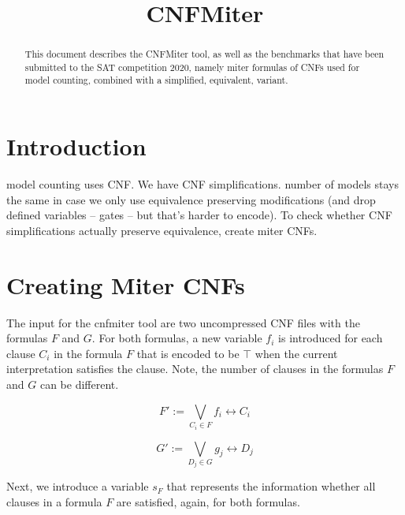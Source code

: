 \documentclass[conference]{IEEEtran}
\begin{document}
	
\title{CNFMiter}

\author{
}

\maketitle

\def\coprocessor{\textsc{Coprocessor}\xspace}

\begin{abstract}
This document describes the CNFMiter tool, as well as the benchmarks that have been submitted to the SAT competition 2020, namely miter formulas of CNFs used for model counting, combined with a simplified, equivalent, variant.
\end{abstract}

\section{Introduction}

model counting uses CNF. We have CNF simplifications. number of models stays the same in case we only use equivalence preserving modifications (and drop defined variables -- gates -- but that's harder to encode).
To check whether CNF simplifications actually preserve equivalence, create miter CNFs.

\section{Creating Miter CNFs}

The input for the cnfmiter tool are two uncompressed CNF files with the formulas $F$ and $G$.
For both formulas, a new variable $f_i$ is introduced for each clause $C_i$ in the formula $F$ that is encoded to be $\top$ when the current interpretation satisfies the clause.
Note, the number of clauses in the formulas $F$ and $G$ can be different.

\[F' := \bigvee_{C_i \in F} f_i \leftrightarrow C_i \]

\[G' := \bigvee_{D_j \in G} g_j \leftrightarrow D_j \]

Next, we introduce a variable $s_F$ that represents the information whether all clauses in a formula $F$ are satisfied, again, for both formulas.
\end{document}
